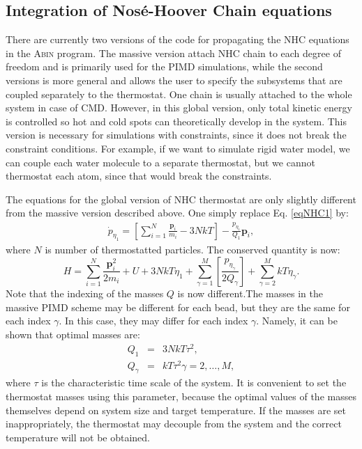 \subsection{Integration of Nosé-Hoover Chain equations}
\label{sec:NHC}
There are currently two versions of the code for propagating the NHC equations in the \textsc{Abin} program. The massive version attach NHC chain to each degree of freedom and is primarily used for the PIMD simulations, while the second versions is more general and allows the user to specify the subsystems that are coupled separately to the thermostat. One chain is usually attached to the whole system in case of CMD. However, in this global version, only total kinetic energy is controlled so hot and cold spots can theoretically develop in the system. This version is necessary for simulations with constraints, since it does not break the constraint conditions. For example, if we want to simulate rigid water model, we can couple each water molecule to a separate thermostat, but we cannot thermostat each atom, since that would break the constraints. 

The equations for the global version of NHC thermostat are only slightly different from the massive version described above. One simply replace Eq. \ref{eqNHC1} by:
\begin{eqnarray}
\dot{p}_{\eta_1}=\left[\sum^N_{i=1}\frac{\mathbf{p}_i}{m_i}-3NkT\right]-\frac{p_{\eta_{1}}}{Q_1}\mathbf{p}_i ,
\end{eqnarray}
where $N$ is number of thermostatted particles. The conserved quantity is now:
\begin{equation}
H = \sum^N_{i=1}\frac{\mathbf{p}_i^2}{2m_i} + U + 3NkT\eta_1 + \sum_{\gamma=1}^M\left[\frac{p_{\eta_\gamma}}{2Q_\gamma}\right]+ \sum_{\gamma=2}^M kT\eta_\gamma   .
\end{equation}
Note that the indexing of the masses $Q$ is now different.The masses in the massive PIMD scheme may be different for each bead, but they are the same for each index $\gamma$. In this case, they may differ for each index $\gamma$. Namely, it can be shown that optimal masses are\cite{Martyna1992a}:
\begin{eqnarray}
Q_1&=&3NkT\tau^2   ,\\
Q_\gamma &=& kT\tau^2   \gamma =2,\dots, M , \nonumber
\end{eqnarray}
where $\tau$ is the characteristic time scale of the system. It is convenient to set the thermostat masses using this parameter, because the optimal values of the masses themselves depend on system size and target temperature. If the masses are set inappropriately, the thermostat may decouple from the system and the correct temperature will not be obtained.

